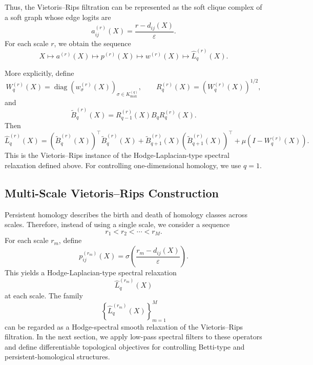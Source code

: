 \documentclass[pdflatex,sn-mathphys-ay]{sn-jnl}%
\theoremstyle{thmstyleone}%
\theoremstyle{thmstyletwo}%
\theoremstyle{thmstylethree}%
\begin{document}
Thus, the Vietoris--Rips filtration can be represented as the soft clique complex of a soft graph whose edge logits are
\[
a_{ij}^{(r)}(X)
=
\frac{r-d_{ij}(X)}{\varepsilon}.
\]
For each scale \(r\), we obtain the sequence
\[
X
\longmapsto
a^{(r)}(X)
\longmapsto
p^{(r)}(X)
\longmapsto
w^{(r)}(X)
\longmapsto
\widehat{L}_q^{(r)}(X).
\]

More explicitly, define
\[
W_q^{(r)}(X)
=
\operatorname{diag}
\left(
w_\sigma^{(r)}(X)
\right)_{\sigma\in K_{\max}^{(q)}},
\qquad
R_q^{(r)}(X)=\left(W_q^{(r)}(X)\right)^{1/2},
\]
and
\[
\widetilde{B}_q^{(r)}(X)
=
R_{q-1}^{(r)}(X)
B_q
R_q^{(r)}(X).
\]
Then
\[
\widehat{L}_q^{(r)}(X)
=
\left(
\widetilde{B}_q^{(r)}(X)
\right)^\top
\widetilde{B}_q^{(r)}(X)
+
\widetilde{B}_{q+1}^{(r)}(X)
\left(
\widetilde{B}_{q+1}^{(r)}(X)
\right)^\top
+
\mu
\left(
I-W_q^{(r)}(X)
\right).
\]
This is the Vietoris--Rips instance of the Hodge-Laplacian-type spectral relaxation defined above.
For controlling one-dimensional homology, we use \(q=1\).

\subsection{Multi-Scale Vietoris--Rips Construction}

Persistent homology describes the birth and death of homology classes across scales. Therefore, instead of using a single scale, we consider a sequence
\[
r_1<r_2<\cdots<r_M.
\]
For each scale \(r_m\), define
\[
p_{ij}^{(r_m)}(X)
=
\sigma\left(
\frac{r_m-d_{ij}(X)}{\varepsilon}
\right).
\]
This yields a Hodge-Laplacian-type spectral relaxation
\[
\widehat{L}_q^{(r_m)}(X)
\]
at each scale. The family
\[
\left\{
\widehat{L}_q^{(r_m)}(X)
\right\}_{m=1}^M
\]
can be regarded as a Hodge-spectral smooth relaxation of the Vietoris--Rips filtration. In the next section, we apply low-pass spectral filters to these operators and define differentiable topological objectives for controlling Betti-type and persistent-homological structures.






\end{document}

